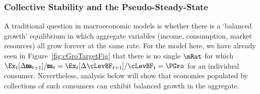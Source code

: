 \documentclass[BufferStockTheory]{subfiles}
\begin{document}
 \begin{comment}
 The full proof is in Appendix~\ref{sec:ApndxMTargetIsStable}, but the key points can be made informally here.  Existence of such a point is guaranteed by
 \begin{enumerate}
 \item Existence, continuity, and monotonicity of $\Ex_t [{\mRat}_{t+1}-\mRat_t]$
 \item $\lim_{\mRat_{t}\downarrow 0} \Ex_t [{\mRat}_{t+1}/\mRat_t] > 1 > \lim_{\mRat_{t}\uparrow \infty} \Ex_t [{\mRat}_{t+1}/\mRat_t]$
\item The intermediate value theorem
\end{enumerate}
 \begin{align}
   \bar{\Rnorm}(1-\mathring{\cFunc}^{\prime}(\mTarg)) & = 1 \\
   (1-\mathring{\cFunc}^{\prime}(\mTarg)) & = \bar{\Rnorm}^{-1} \\   
 \end{align}

 The fact (cf.\ \eqref{eq:MinMPCDef}) that the minimum value of $\mathring{\cFunc}^{\prime}$ is $1-\PatR$ converts \eqref{eq:mTargDerImplicit} to the inequality $1-\bar{\Rnorm}^{-1} > 1-\PatR$ from which we have
 \begin{align}
      \PGroAdj/\Rfree & > \Pat/\Rfree \notag
\\    1 & > \Pat/\PGroAdj
 \end{align}
 which is the {\GICNrm}; thus, if a stable point exists, it must satisfy the {\GICNrm}.  (The appendix proves that if the {\GICNrm} is satisfied, such a point must exist, and be globally stable).
\end{comment}

 \hypertarget{Collective-Stability}{}
 \subsubsection{Collective Stability and the Pseudo-Steady-State}\label{subsubsec:mSteadyState}
 A traditional question in macroeconomic models is whether there is a `balanced growth' equilibrium in which aggregate variables (income, consumption, market resources) all grow forever at the same rate.  For the model here, we have already seen in Figure~\ref{fig:cGroTargetFig} that there is no single $\mRat$ for which $\Ex_{t}[\Delta \mRatBF_{t+1}]/\mRatBF_{t} = \Ex_{t}[\Delta \cLevBF_{t+1}]/\cLevBF_{t} = \PGro$ for an individual consumer.  Nevertheless, analysis below will show that economies populated by collections of such consumers can exhibit balanced growth in the aggregate.
\end{document}
